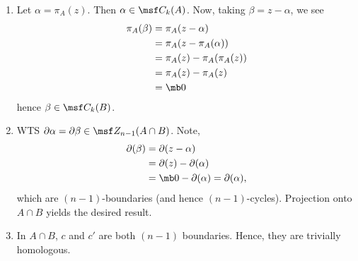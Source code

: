 \begin{solution}
  \begin{enumerate}[label=(\arabic*)]
    \item Let $\alpha = \pi_A(z)$. Then $\alpha \in \msf C_k(A)$. Now,
      taking $\beta = z - \alpha$, we see
      \begin{align*}
        \pi_A(\beta)
        &= \pi_A(z - \alpha) \\
        &= \pi_A(z - \pi_A(\alpha)) \\
        &= \pi_A(z) - \pi_A(\pi_A(z)) \\
        &= \pi_A(z) - \pi_A(z) \\
        &= \mb 0
      \end{align*}
      hence $\beta \in \msf C_k(B)$.
    \item WTS $\partial \alpha = \partial \beta \in \msf Z_{n-1}(A
      \cap B)$. Note,
      \begin{align*}
        \partial(\beta)
        &= \partial(z - \alpha) \\
        &= \partial(z) - \partial(\alpha) \\
        &= \mb 0 -\partial(\alpha) = \partial(\alpha),
      \end{align*}
      which are $(n-1)$-boundaries (and hence $(n-1)$-cycles).
      Projection onto $A \cap B$ yields the desired result.
    \item In $A \cap B$, $c$ and $c'$ are both $(n-1)$ boundaries.
      Hence, they are trivially homologous.
  \end{enumerate}
\end{solution}

